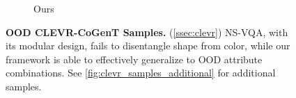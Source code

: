 \begin{figure}[t]
\begin{subfigure}{.32915\linewidth}
\caption{Ours}
\end{subfigure}
\caption{\textbf{OOD CLEVR-CoGenT Samples.} (\cref{ssec:clevr})
NS-VQA, with its modular design, fails to disentangle shape from color, while our framework is able to effectively generalize to OOD attribute combinations.
See \cref{fig:clevr_samples_additional} for additional samples.
}
\label{fig:clevr_samples}
\end{figure}